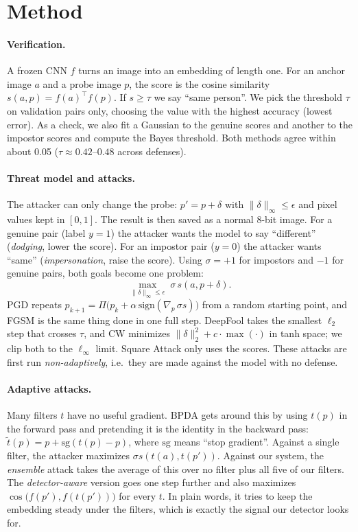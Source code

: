 \section{Method}
\label{sec:method}
\paragraph{Verification.} A frozen CNN $f$ turns an image into an embedding of length one. For an anchor image $a$ and a probe image $p$, the score is the cosine similarity $s(a,p)=f(a)^\top f(p)$. If $s\ge\tau$ we say ``same person''. We pick the threshold $\tau$ on validation pairs only, choosing the value with the highest accuracy (lowest error). As a check, we also fit a Gaussian to the genuine scores and another to the impostor scores and compute the Bayes threshold. Both methods agree within about 0.05 ($\tau\approx0.42$--$0.48$ across defenses).

\paragraph{Threat model and attacks.} The attacker can only change the probe: $p'=p+\delta$ with $\|\delta\|_\infty\le\epsilon$ and pixel values kept in $[0,1]$. The result is then saved as a normal 8-bit image. For a genuine pair (label $y{=}1$) the attacker wants the model to say ``different'' (\emph{dodging}, lower the score). For an impostor pair ($y{=}0$) the attacker wants ``same'' (\emph{impersonation}, raise the score). Using $\sigma=+1$ for impostors and $-1$ for genuine pairs, both goals become one problem:
\begin{equation}
\max_{\|\delta\|_\infty\le\epsilon}\; \sigma\, s(a,p+\delta).
\end{equation}
PGD repeats $p_{k+1}=\Pi\big(p_k+\alpha\,\mathrm{sign}(\nabla_{p}\,\sigma s)\big)$ from a random starting point, and FGSM is the same thing done in one full step. DeepFool takes the smallest $\ell_2$ step that crosses $\tau$, and CW minimizes $\|\delta\|_2^2+c\cdot\max(\cdot)$ in tanh space; we clip both to the $\ell_\infty$ limit. Square Attack only uses the scores. These attacks are first run \emph{non-adaptively}, i.e.\ they are made against the model with no defense.

\paragraph{Adaptive attacks.} Many filters $t$ have no useful gradient. BPDA gets around this by using $t(p)$ in the forward pass and pretending it is the identity in the backward pass: $\tilde t(p)=p+\mathrm{sg}(t(p)-p)$, where $\mathrm{sg}$ means ``stop gradient''. Against a single filter, the attacker maximizes $\sigma s(t(a),t(p'))$. Against our system, the \emph{ensemble} attack takes the average of this over no filter plus all five of our filters. The \emph{detector-aware} version goes one step further and also maximizes $\cos\big(f(p'),f(t(p'))\big)$ for every $t$. In plain words, it tries to keep the embedding steady under the filters, which is exactly the signal our detector looks for.

